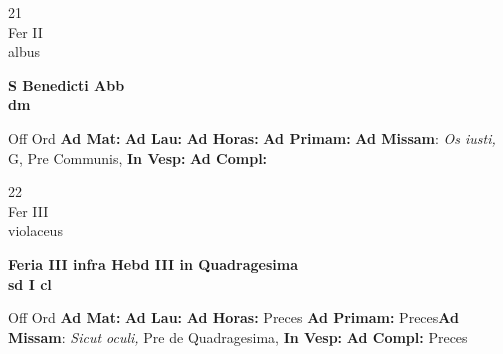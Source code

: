 \documentclass[10pt, openany]{book}
\begin{document}
    \begin{center}
        \begin{minipage}{3.5in}
            \vspace{2em}
            \begin{minipage}{0.5in}
                {\Huge 21} \\
                {\normalsize Fer II} \\
                {\normalsize albus}
            \end{minipage}
            \begin{minipage}{3.0in}
                \textbf{ \large S Benedicti Abb \\
                \textnormal{\normalsize dm}} \\ 
            \end{minipage}
            \begin{justify}Off Ord
                \textbf{Ad Mat: }
                \textbf{Ad Lau: }
                \textbf{Ad Horas: }
                \textbf{Ad Primam: }\textbf{Ad Missam}: \textit{Os iusti,} G, Pre Communis,  
                \textbf{In Vesp: }
                \textbf{Ad Compl: }
            \end{justify}
        \end{minipage}
    \end{center}

    \begin{center}
        \begin{minipage}{3.5in}
            \vspace{2em}
            \begin{minipage}{0.5in}
                {\Huge 22} \\
                {\normalsize Fer III} \\
                {\normalsize violaceus}
            \end{minipage}
            \begin{minipage}{3.0in}
                \textbf{ \large Feria III infra Hebd III in Quadragesima \\
                \textnormal{\normalsize sd I cl}} \\ 
            \end{minipage}
            \begin{justify}Off Ord
                \textbf{Ad Mat: }
                \textbf{Ad Lau: }
                \textbf{Ad Horas: }Preces
                \textbf{Ad Primam: }Preces\textbf{Ad Missam}: \textit{Sicut oculi,} Pre de Quadragesima,  
                \textbf{In Vesp: }
                \textbf{Ad Compl: }Preces
            \end{justify}
        \end{minipage}
    \end{center}
\end{document}
